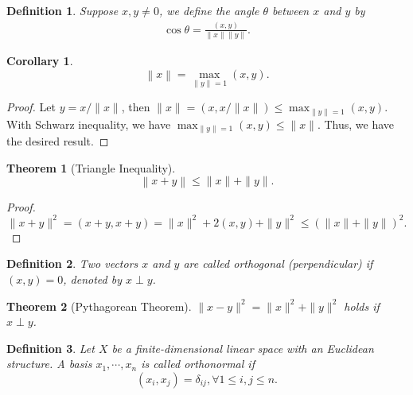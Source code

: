 \documentclass[11pt]{book}
\newtheorem{definition}{Definition}[chapter]
\newtheorem{theorem}{Theorem}[chapter]
\newtheorem{corollary}{Corollary}[theorem]
\theoremstyle{definition}
\numberwithin{equation}{chapter}
\begin{document}
\medskip

\begin{definition}
Suppose $x,y\neq 0$, we define the angle $\theta$ between $x$ and $y$ by
\begin{align*}
    \cos \theta = \frac{(x,y)}{\|x\| \|y\|}.
\end{align*}
\end{definition}

\medskip

\begin{corollary}
$$\left\|x\right\| = \max_{\|y\| = 1} (x,y).$$
\end{corollary}
\begin{proof}
Let $y = x/\|x\|$, then $\|x\| = \left(x, x/\|x\|\right) \leq \max_{\|y\| = 1} (x,y)$. With Schwarz inequality, we have $\max_{\|y\| = 1} (x,y) \leq \|x\|$. Thus, we have the desired result.
\end{proof}

\medskip

\begin{theorem}[Triangle Inequality]
$$\left\|x + y\right\|\leq \|x\| + \|y\|.$$
\end{theorem}
\begin{proof}
$$\|x+y\|^2 = (x+y, x+y) = \|x\|^2 + 2(x,y) + \|y\|^2 \leq (\|x\| + \|y\|)^2.$$
\end{proof}

\medskip

\begin{definition}
Two vectors $x$ and $y$ are called orthogonal (perpendicular) if $(x,y) = 0$, denoted by $x \perp y$.
\end{definition}

\medskip

\begin{theorem}[Pythagorean Theorem]
$\|x-y\|^2 = \|x\|^2 + \|y\|^2$ holds if $x \perp y$.
\end{theorem}

\medskip

\begin{definition}
Let $X$ be a finite-dimensional linear space with an Euclidean structure. A basis $x_1, \cdots, x_n$ is called orthonormal if 
$$(x_i, x_j) = \delta_{ij}, \forall 1\leq i,j\leq n.$$
\end{definition}

\medskip
\end{document}
